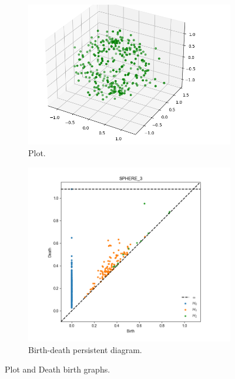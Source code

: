 \documentclass[11pt,a4paper]{report}
\begin{document}
              \begin{figure}[H]
                \centering
                \begin{subfigure}[b]{0.45\linewidth}
                  \includegraphics[width=\linewidth]{./ripser/rand_sphere.PNG}
                  \caption{Plot.}
                \end{subfigure}
                \begin{subfigure}[b]{0.45\linewidth}
                  \includegraphics[width=\linewidth]{./ripser/rand_sphere_homology.PNG}
                  \caption{Birth-death persistent diagram.}
                \end{subfigure}
                \caption{Plot and Death birth graphs.}
                \label{fig: plot death}
              \end{figure}
\end{document}
